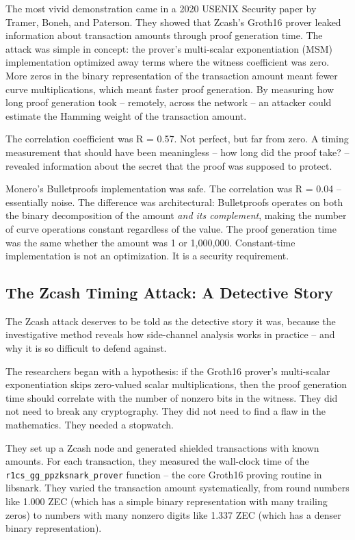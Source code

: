 \documentclass[
  11pt,
  openany]{report}
\begin{document}
The most vivid demonstration came in a 2020 USENIX Security paper by Tramer,
Boneh, and Paterson. They showed that Zcash's Groth16 prover leaked information
about transaction amounts through proof generation time. The attack was simple
in concept: the prover's multi-scalar exponentiation (MSM) implementation
optimized away terms where the witness coefficient was zero. More zeros in the
binary representation of the transaction amount meant fewer curve
multiplications, which meant faster proof generation. By measuring how long
proof generation took -- remotely, across the network -- an attacker could
estimate the Hamming weight of the transaction amount.

The correlation coefficient was R = 0.57. Not perfect, but far from zero. A
timing measurement that should have been meaningless -- how long did the proof
take? -- revealed information about the secret that the proof was supposed to
protect.

Monero's Bulletproofs implementation was safe. The correlation was R = 0.04 --
essentially noise. The difference was architectural: Bulletproofs operates on
both the binary decomposition of the amount \emph{and its complement}, making
the number of curve operations constant regardless of the value. The proof
generation time was the same whether the amount was 1 or 1,000,000.
Constant-time implementation is not an optimization. It is a security
requirement.

\subsection{The Zcash Timing Attack: A Detective
Story}\label{the-zcash-timing-attack-a-detective-story}

The Zcash attack deserves to be told as the detective story it was, because the
investigative method reveals how side-channel analysis works in practice -- and
why it is so difficult to defend against.

The researchers began with a hypothesis: if the Groth16 prover's multi-scalar
exponentiation skips zero-valued scalar multiplications, then the proof
generation time should correlate with the number of nonzero bits in the witness.
They did not need to break any cryptography. They did not need to find a flaw in
the mathematics. They needed a stopwatch.

They set up a Zcash node and generated shielded transactions with known amounts.
For each transaction, they measured the wall-clock time of the
\texttt{r1cs\_gg\_ppzksnark\_prover} function -- the core Groth16 proving
routine in libsnark. They varied the transaction amount systematically, from
round numbers like 1.000 ZEC (which has a simple binary representation with many
trailing zeros) to numbers with many nonzero digits like 1.337 ZEC (which has a
denser binary representation).
\end{document}
